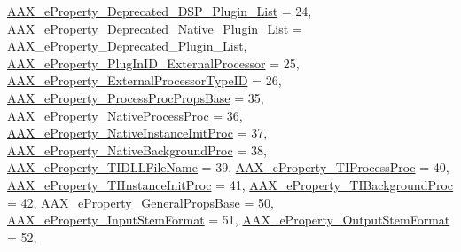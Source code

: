 \begin{DoxyCompactItemize}
\mbox{\hyperlink{a00662_a13e384f22825afd3db6d68395b79ce0dab102bc794f2770c14b1f0fe2dde6766a}{A\+A\+X\+\_\+e\+Property\+\_\+\+Deprecated\+\_\+\+D\+S\+P\+\_\+\+Plugin\+\_\+\+List}} = 24, 
\mbox{\hyperlink{a00662_a13e384f22825afd3db6d68395b79ce0da3f1e690c987d601001a7cc1da8247399}{A\+A\+X\+\_\+e\+Property\+\_\+\+Deprecated\+\_\+\+Native\+\_\+\+Plugin\+\_\+\+List}} = A\+A\+X\+\_\+e\+Property\+\_\+\+Deprecated\+\_\+\+Plugin\+\_\+\+List, 
\newline
\mbox{\hyperlink{a00662_a13e384f22825afd3db6d68395b79ce0da2816852168f862575c687d28b48d0581}{A\+A\+X\+\_\+e\+Property\+\_\+\+Plug\+In\+I\+D\+\_\+\+External\+Processor}} = 25, 
\mbox{\hyperlink{a00662_a13e384f22825afd3db6d68395b79ce0dae51207358c4c8a00e6c5e26650ebeef2}{A\+A\+X\+\_\+e\+Property\+\_\+\+External\+Processor\+Type\+ID}} = 26, 
\mbox{\hyperlink{a00662_a13e384f22825afd3db6d68395b79ce0da9a78445174f219014332c67af3b1eda6}{A\+A\+X\+\_\+e\+Property\+\_\+\+Process\+Proc\+Props\+Base}} = 35, 
\mbox{\hyperlink{a00662_a13e384f22825afd3db6d68395b79ce0da43e55994526d4623cab23fc3200d3762}{A\+A\+X\+\_\+e\+Property\+\_\+\+Native\+Process\+Proc}} = 36, 
\newline
\mbox{\hyperlink{a00662_a13e384f22825afd3db6d68395b79ce0da0f182ea271ec0aa1a49dd9c995826ef5}{A\+A\+X\+\_\+e\+Property\+\_\+\+Native\+Instance\+Init\+Proc}} = 37, 
\mbox{\hyperlink{a00662_a13e384f22825afd3db6d68395b79ce0daee9d07e634f3f31988e0bbcfa33a6222}{A\+A\+X\+\_\+e\+Property\+\_\+\+Native\+Background\+Proc}} = 38, 
\mbox{\hyperlink{a00662_a13e384f22825afd3db6d68395b79ce0daa38d1dee38945c7b0f5333b6cec02819}{A\+A\+X\+\_\+e\+Property\+\_\+\+T\+I\+D\+L\+L\+File\+Name}} = 39, 
\mbox{\hyperlink{a00662_a13e384f22825afd3db6d68395b79ce0da1c4750cff6cd0dc467287edfb88ed495}{A\+A\+X\+\_\+e\+Property\+\_\+\+T\+I\+Process\+Proc}} = 40, 
\newline
\mbox{\hyperlink{a00662_a13e384f22825afd3db6d68395b79ce0dace404ac7f105c8bca24cf14e26479265}{A\+A\+X\+\_\+e\+Property\+\_\+\+T\+I\+Instance\+Init\+Proc}} = 41, 
\mbox{\hyperlink{a00662_a13e384f22825afd3db6d68395b79ce0dafcf70d8ff9b7a5853ce6248b8deeaeef}{A\+A\+X\+\_\+e\+Property\+\_\+\+T\+I\+Background\+Proc}} = 42, 
\mbox{\hyperlink{a00662_a13e384f22825afd3db6d68395b79ce0da363690ab5ed1b5ee3666eda48e2b2500}{A\+A\+X\+\_\+e\+Property\+\_\+\+General\+Props\+Base}} = 50, 
\mbox{\hyperlink{a00662_a13e384f22825afd3db6d68395b79ce0dadebf03028b758123965a8b988fa2df99}{A\+A\+X\+\_\+e\+Property\+\_\+\+Input\+Stem\+Format}} = 51, 
\newline
\mbox{\hyperlink{a00662_a13e384f22825afd3db6d68395b79ce0da211fdc6277e7fa652b5d482e810b0bc9}{A\+A\+X\+\_\+e\+Property\+\_\+\+Output\+Stem\+Format}} = 52, 

\end{DoxyCompactItemize}
